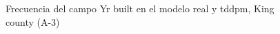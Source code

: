 \begin{figure}[H]
    \centering
    
    \caption{Frecuencia del campo Yr built en el modelo real y tddpm, King county (A-3)}
    \label{frecuency-tddpm-yr built}
\end{figure}